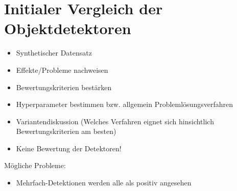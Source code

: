 \section{Initialer Vergleich der Objektdetektoren}

\begin{itemize}
	\item Synthetischer Datensatz
	\item Effekte/Probleme nachweisen
	\item Bewertungskriterien bestärken
	\item Hyperparameter bestimmen bzw. allgemein Problemlösungsverfahren
	\item Variantendiskussion (Welches Verfahren eignet sich hinsichtlich Bewertungskriterien am besten)
	\item Keine Bewertung der Detektoren!
\end{itemize}

Mögliche Probleme:
\begin{itemize}
	\item Mehrfach-Detektionen werden alle als positiv angesehen
\end{itemize} 
